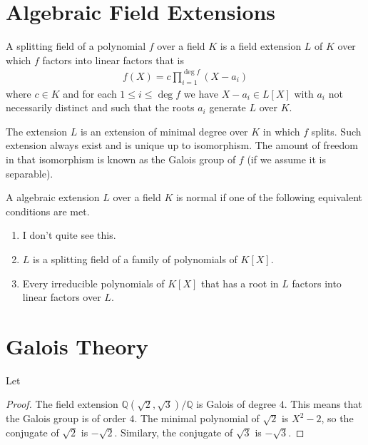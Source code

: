 
\chapter{Algebraic Field Extensions}
\begin{defbox}
    \begin{definition}
        A splitting field of a polynomial \(f\) over a field \(K\) is a field extension \(L\) of \(K\) over which \(f\) factors into linear factors that is
        \begin{align*}
            f(X) = c \prod_{i=1}^{\deg f} (X - a_i)
        \end{align*}
        where \(c \in K\) and for each \(1 \leq i \leq \deg f\) we have \(X - a_i \in L[X]\) with \(a_i\) not necessarily distinct and such that the roots \(a_i\) generate \(L\) over \(K\).
    \end{definition}
\end{defbox}
\begin{remark}
    The extension \(L\) is an extension of minimal degree over \(K\) in which \(f\) splits. Such extension always exist and is unique up to isomorphism. The amount of freedom in that isomorphism is known as the Galois group of \(f\) (if we assume it is separable).
\end{remark}

\begin{defbox}
    \begin{definition}
        A algebraic extension \(L\) over a field \(K\) is normal if one of the following equivalent conditions are met.
        \begin{enumerate}
            \item I don't quite see this.
            \item \(L\) is a splitting field of a family of polynomials of \(K[X]\).
            \item Every irreducible polynomials of \(K[X]\) that has a root in \(L\) factors into linear factors over \(L\).
        \end{enumerate}
    \end{definition}
\end{defbox}

\chapter{Galois Theory}

\begin{example}
    Let \(\)
\end{example}
\begin{proof}
    The field extension \(\mathbb{Q}(\sqrt{2}, \sqrt{3}) / \mathbb{Q}\) is Galois of degree \(4\). This means that the Galois group is of order \(4\). The minimal polynomial of \(\sqrt{2}\) is \(X^2 - 2\), so the conjugate of \(\sqrt{2}\) is \(-\sqrt{2}\). Similary, the conjugate of \(\sqrt{3}\) is \(-\sqrt{3}\).
\end{proof}

